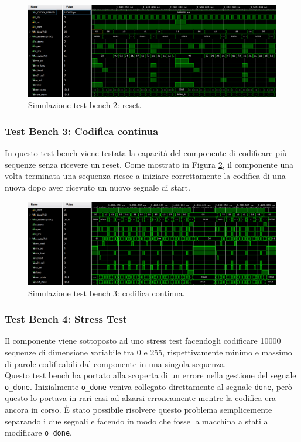 \documentclass[fleqn,11pt]{article}
\begin{document}
\begin{figure}[h]
    \centering
    \includegraphics[width=\textwidth]{reset}
    \caption{Simulazione test bench 2: reset.}
    \label{fig:reset}
\end{figure}

\subsubsection{Test Bench 3: Codifica continua}
In questo test bench viene testata la capacità del componente di codificare più sequenze senza ricevere un reset. Come mostrato in Figura \ref{fig:seq_cont}, il componente una volta terminata una sequenza riesce a iniziare correttamente la codifica di una nuova dopo aver ricevuto un nuovo segnale di start.

\begin{figure}
    \centering
    \includegraphics[width=\textwidth]{seq_cont}
    \caption{Simulazione test bench 3: codifica continua.}
    \label{fig:seq_cont}
\end{figure}

\subsubsection{Test Bench 4: Stress Test}
Il componente viene sottoposto ad uno stress test facendogli codificare 10000 sequenze di dimensione variabile tra 0 e 255, rispettivamente minimo e massimo di parole codificabili dal componente in una singola sequenza.\\
Questo test bench ha portato alla scoperta di un errore nella gestione del segnale \verb|o_done|. Inizialmente \verb|o_done| veniva collegato direttamente al segnale \verb|done|, però questo lo portava in rari casi ad alzarsi erroneamente mentre la codifica era ancora in corso. È stato possibile risolvere questo problema semplicemente separando i due segnali e facendo in modo che fosse la macchina a stati a modificare \verb|o_done|.
\end{document}
